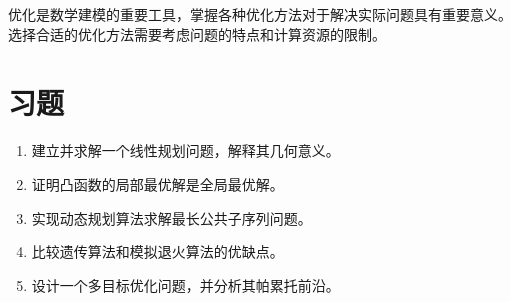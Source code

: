 \begin{definitionbox}[title=本章要点]
优化是数学建模的重要工具，掌握各种优化方法对于解决实际问题具有重要意义。选择合适的优化方法需要考虑问题的特点和计算资源的限制。
\end{definitionbox}

\section*{习题}

\begin{enumerate}
    \item 建立并求解一个线性规划问题，解释其几何意义。
    
    \item 证明凸函数的局部最优解是全局最优解。
    
    \item 实现动态规划算法求解最长公共子序列问题。
    
    \item 比较遗传算法和模拟退火算法的优缺点。
    
    \item 设计一个多目标优化问题，并分析其帕累托前沿。
\end{enumerate} 